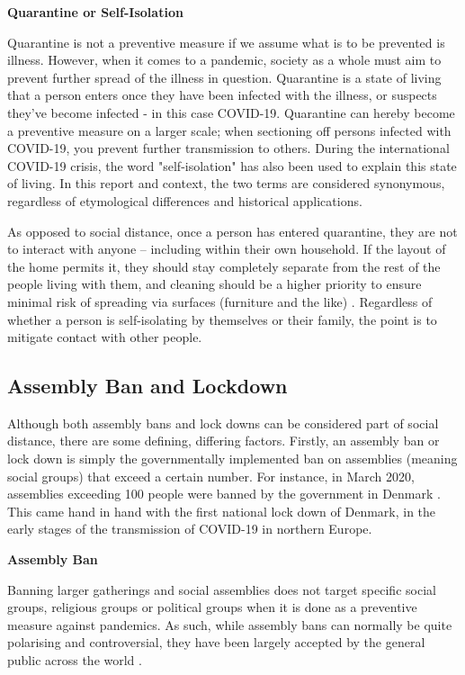 \textbf{Quarantine or Self-Isolation}

Quarantine is not a preventive measure if we assume what is to be prevented is illness. However, when it comes to a pandemic, society as a whole must aim to prevent further spread of the illness in question. Quarantine is a state of living that a person enters once they have been infected with the illness, or suspects they've become infected - in this case COVID-19. Quarantine can hereby become a preventive measure on a larger scale; when sectioning off persons infected with COVID-19, you prevent further transmission to others. During the international COVID-19 crisis, the word "self-isolation" has also been used to explain this state of living. In this report and context, the two terms are considered synonymous, regardless of etymological differences and historical applications.

As opposed to social distance, once a person has entered quarantine, they are not to interact with anyone – including within their own household. If the layout of the home permits it, they should stay completely separate from the rest of the people living with them, and cleaning should be a higher priority to ensure minimal risk of spreading via surfaces (furniture and the like) \citep{ayenigbara_covid-19_2020}. Regardless of whether a person is self-isolating by themselves or their family, the point is to mitigate contact with other people.

\subsection{Assembly Ban and Lockdown}

Although both assembly bans and lock downs can be considered part of social distance, there are some defining, differing factors. Firstly, an assembly ban or lock down is simply the governmentally implemented ban on assemblies (meaning social groups) that exceed a certain number. For instance, in March 2020, assemblies exceeding 100 people were banned by the government in Denmark \citep{ronnstad_tidslinje_2020}. This came hand in hand with the first national lock down of Denmark, in the early stages of the transmission of COVID-19 in northern Europe. 

\textbf{Assembly Ban}

Banning larger gatherings and social assemblies does not target specific social groups, religious groups or political groups when it is done as a preventive measure against pandemics. As such, while assembly bans can normally be quite polarising and controversial, they have been largely accepted by the general public across the world \citep{gostin_governmental_2020}. 

